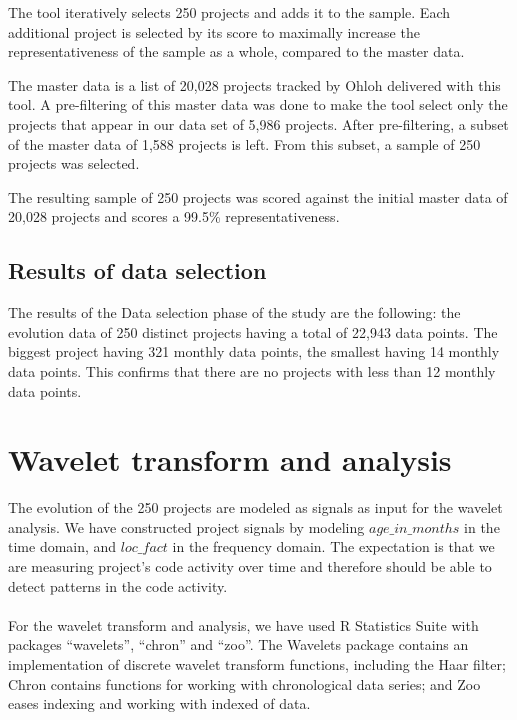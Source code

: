 The tool iteratively selects 250 projects and adds it to the sample. Each
additional project is selected by its score to maximally increase the
representativeness of the sample as a whole, compared to the master data.

The master data is a list of 20,028 projects tracked by Ohloh delivered with
this tool. A pre-filtering of this master data was done to make the tool select
only the projects that appear in our data set of 5,986 projects. After
pre-filtering, a subset of the master data of 1,588 projects is left. From this
subset, a sample of 250 projects was selected.

The resulting sample of 250 projects was scored against the initial master data
of 20,028 projects and scores a 99.5\% representativeness.

\subsection{Results of data selection}
The results of the Data selection phase of the study are the following: the
evolution data of 250 distinct projects having a total of 22,943 data points.
The biggest project having 321 monthly data points, the smallest having 14
monthly data points. This confirms that there are no projects with less
than 12 monthly data points.


\section{Wavelet transform and analysis}
\label{method:dwt}

The evolution of the 250 projects are modeled as signals as input for the
wavelet analysis. We have constructed project signals by modeling
$age\_in\_months$ in the time domain, and $loc\_fact$ in the frequency domain.
The expectation is that we are measuring project's code activity over time and
therefore should be able to detect patterns in the code activity.

\paragraph{}
For the wavelet transform and analysis, we have used R Statistics Suite
with packages ``wavelets'', ``chron'' and ``zoo''. The Wavelets package
contains an implementation of discrete wavelet transform functions, including
the Haar filter; Chron contains functions for working with chronological data
series; and Zoo eases indexing and working with indexed of data.

